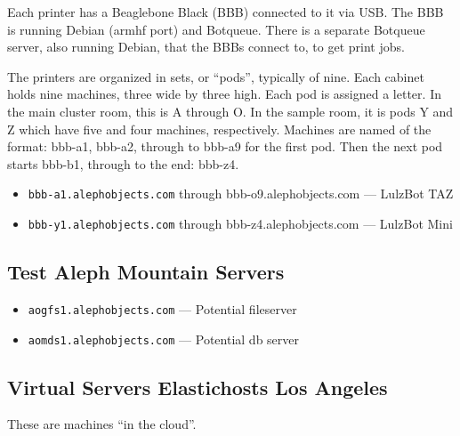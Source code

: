 Each printer has a Beaglebone Black (BBB) connected to it via USB. The
BBB is running Debian (armhf port) and Botqueue. There is a separate Botqueue
server, also running Debian, that the BBBs connect to, to get print jobs.

The printers are organized in sets, or ``pods'', typically of nine. Each cabinet
holds nine machines, three wide by three high. Each pod is assigned a letter.
In the main cluster room, this is A through O. In the sample room, it is pods
Y and Z which have five and four machines, respectively. Machines are named
of the format: bbb-a1, bbb-a2, through to bbb-a9 for the first pod. Then the
next pod starts bbb-b1, through to the end: bbb-z4.

\begin{itemize}
\item \texttt{bbb-a1.alephobjects.com} through {bbb-o9.alephobjects.com} --- LulzBot TAZ
\item \texttt{bbb-y1.alephobjects.com} through {bbb-z4.alephobjects.com} --- LulzBot Mini
\end{itemize}

\subsection{Test Aleph Mountain Servers}
\begin{itemize}
\item \texttt{aogfs1.alephobjects.com} --- Potential fileserver
\item \texttt{aomds1.alephobjects.com} --- Potential db server
\end{itemize}

\subsection{Virtual Servers Elastichosts Los Angeles}
These are machines ``in the cloud''.

